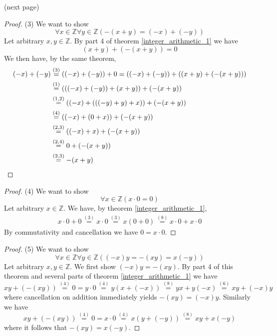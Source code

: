 \documentclass{report}
\begin{document}
\noindent(next page)\newpage
\begin{proof}(3)
We want to show
\begin{equation*}
\forall x\in\mathbb Z\forall y\in\mathbb Z(-(x+y)=(-x)+(-y))
\end{equation*}
Let arbitrary $x,y\in\mathbb Z$. By part 4 of theorem \ref{integer_arithmetic_1} we have
\begin{equation*}
(x+y)+(-(x+y))=0
\end{equation*}
We then have, by the same theorem,
\begin{align*}
(-x)+(-y)&\overset{(3)}{=}((-x)+(-y))+0=((-x)+(-y))+((x+y)+(-(x+y)))\\
&\overset{(1)}{=}(((-x)+(-y))+(x+y))+(-(x+y))\\
&\overset{(1,2)}{=}((-x)+(((-y)+y)+x))+(-(x+y))\\
&\overset{(4)}{=}((-x)+(0+x))+(-(x+y))\\
&\overset{(2,3)}{=}((-x)+x)+(-(x+y))\\
&\overset{(2,4)}{=}0+(-(x+y))\\
&\overset{(2,3)}{=}-(x+y)\qedhere
\end{align*}
\end{proof}
\begin{proof}(4)
We want to show
\begin{equation*}
\forall x\in\mathbb Z(x\cdot0=0)
\end{equation*}
Let arbitrary $x\in\mathbb Z$. We have, by theorem \ref{integer_arithmetic_1},
\begin{align*}
x\cdot0+0\overset{(3)}{=}x\cdot0\overset{(3)}{=}x(0+0)\overset{(8)}{=}x\cdot0+x\cdot0
\end{align*}
By commutativity and cancellation we have $0=x\cdot0$.\qedhere
\end{proof}
\begin{proof}(5)
We want to show
\begin{equation*}
\forall x\in\mathbb Z\forall y\in\mathbb Z((-x)y=-(xy)=x(-y))
\end{equation*}
Let arbitrary $x,y\in\mathbb Z$. We first show $(-x)y=-(xy)$. By part 4 of this theorem and several parts of theorem 
\ref{integer_arithmetic_1} we have
\begin{equation*}
xy+(-(xy))\overset{(4)}{=}0=y\cdot0\overset{(4)}{=}y(x+(-x))\overset{(8)}{=}yx+y(-x)\overset{(6)}{=}xy+(-x)y
\end{equation*}
where cancellation on addition immediately yields $-(xy)=(-x)y$.
Similarly we have
\begin{equation*}
xy+(-(xy))\overset{(4)}{=}0=x\cdot0\overset{(4)}{=}x(y+(-y))\overset{(8)}{=}xy+x(-y)
\end{equation*}
where it follows that $-(xy)=x(-y)$.
\end{proof}
\end{document}
